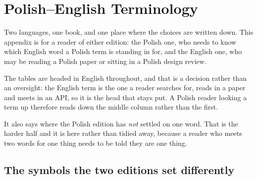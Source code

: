 %
%

\chapter{Polish--English Terminology}
\label{app:D}

\noindent
Two languages, one book, and one place where the choices are written down. This
appendix is for a reader of either edition: the Polish one, who needs to know
which English word a Polish term is standing in for, and the English one, who
may be reading a Polish paper or sitting in a Polish design review.

The tables are headed in English throughout, and that is a decision rather than
an oversight: the English term is the one a reader searches for, reads in a
paper and meets in an API, so it is the head that stays put. A Polish reader
looking a term up therefore reads down the middle column rather than the first.

It also says where the Polish edition has \emph{not} settled on one word. That
is the harder half and it is here rather than tidied away, because a reader who
meets two words for one thing needs to be told they are one thing.

\section{The symbols the two editions set differently}
\label{sec:D-notation}

